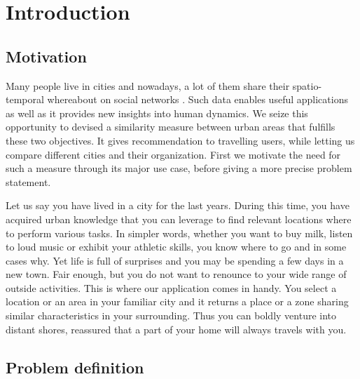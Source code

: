 \chapter{Introduction}
\label{ch:introduction}

\section{Motivation}

Many people live in cities and nowadays, a lot of them share their
spatio-temporal whereabout on social networks \autocite{SpatialComputing12}.
Such data enables useful applications as well as it provides new insights into
human dynamics. We seize this opportunity to devised a similarity measure
between urban areas that fulfills these two objectives. It gives
recommendation to travelling users, while letting us compare different cities
and their organization. First we motivate the need for such a measure through
its major use case, before giving a more precise problem statement.

\medskip

Let us say you have lived in a city for the last years. During this time, you
have acquired urban knowledge that you can leverage to find relevant locations
where to perform various tasks. In simpler words, whether you want to buy
milk, listen to loud music or exhibit your athletic skills, you know where to
go and in some cases why. Yet life is full of surprises and you may be
spending a few days in a new town. Fair enough, but you do not want to
renounce to your wide range of outside activities. This is where our
application comes in handy. You select a location or an area in your familiar
city and it returns a place or a zone sharing similar characteristics in your
surrounding. Thus you can boldly venture into distant shores, reassured that a
part of your home will always travels with you.

\section{Problem definition}
\label{sec:problem}

